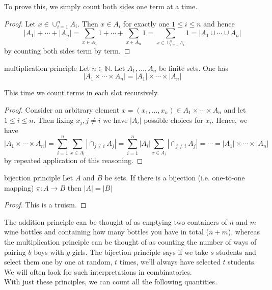 \documentclass{article}
\begin{document}
To prove this, we simply count both sides one term at a time.

\begin{proof}
    Let $x \in \cup_{i=1}^n A_i$. Then $x \in A_i$ for exactly one $1 \leq i \leq n$ and hence 
    \[|A_1| + \cdots + |A_n| =\sum_{x \in A_1}1 + \cdots + \sum_{x \in A_n}1 = \sum_{x \in \cup_{i=1}^n A_i}1 = |A_1 \cup \cdots \cup A_n|\] 
    by counting both sides term by term.
\end{proof}

\begin{theorem}[]{multiplication principle}
    Let $n \in \mathbb{N}$. Let $A_1, \dots, A_n$ be finite sets. One has
    \[|A_1 \times \cdots \times A_n| = |A_1| \times \cdots \times |A_n|\]
\end{theorem}

This time we count terms in each slot recursively.

\begin{proof}
    Consider an arbitrary element $x = (x_1, \dots, x_n) \in A_1 \times \cdots \times A_n$ and let $1 \leq i \leq n$. Then fixing $x_j, j \neq i$
    we have $|A_i|$ possible choices for $x_i$. Hence, we have 
    \[|A_1 \times \cdots \times A_n| = \sum_{i=1}^n\sum_{x \in A_i}\left|\cap_{j \neq i}A_j\right| 
    = \sum_{i=1}^n |A_i|\sum_{x \in A_i}\left|\cap_{j \neq i}A_j\right| = \cdots = |A_1| \times \cdots \times |A_n|\]
    by repeated application of this reasoning.
\end{proof}

\begin{theorem}[]{bijection principle}
    Let $A$ and $B$ be sets. If there is a bijection (i.e. one-to-one mapping) $\pi: A \to B$ then $|A| = |B|$
\end{theorem}

\begin{proof}
    This is a truism. 
\end{proof}

The addition principle can be thought of as emptying two containers of $n$ and $m$ wine bottles and containing how many bottles you have 
in total ($n+m$), whereas the multiplication principle can be thought of as counting the number of ways of pairing $b$ boys with $g$ girls. 
The bijection principle says if we take $s$ students and select them one by one at random, $t$ times, we'll always have selected $t$ students. 
We will often look for such interpretations in combinatorics. \\

With just these principles, we can count all the following quantities. 
\end{document}
